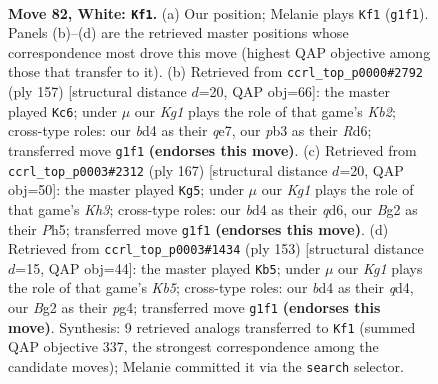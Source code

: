 \documentclass[11pt]{article}
\begin{document}
\clearpage

\begin{figure}[p]\centering
\begin{subfigure}{0.46\textwidth}\centering
\resizebox{\linewidth}{!}{%
\newchessgame
\chessboard[
  setfen={8/8/8/8/3b4/1p5q/3k2B1/6K1 w - - 6 82},
  showmover=false,
  pgfstyle=straightmove, color=movearrow, markmove={g1-f1}
]}
\caption{}
\end{subfigure}\hfill
\begin{subfigure}{0.46\textwidth}\centering
\resizebox{\linewidth}{!}{%
\newchessgame
\chessboard[
  setfen={8/1k2Q3/3r2b1/6P1/5K2/8/8/8 b - - 14 79},
  showmover=false,
  pgfstyle=straightmove, color=movearrow, markmove={b7-c6}
]}
\caption{}
\end{subfigure}
\\[4pt]
\begin{subfigure}{0.46\textwidth}\centering
\resizebox{\linewidth}{!}{%
\newchessgame
\chessboard[
  setfen={q7/8/3Q3k/2P4p/8/2K5/8/8 b - - 4 84},
  showmover=false,
  pgfstyle=straightmove, color=movearrow, markmove={h6-g5}
]}
\caption{}
\end{subfigure}\hfill
\begin{subfigure}{0.46\textwidth}\centering
\resizebox{\linewidth}{!}{%
\newchessgame
\chessboard[
  setfen={2q5/8/6K1/8/1k1Q2P1/8/8/8 b - - 0 77},
  showmover=false,
  pgfstyle=straightmove, color=movearrow, markmove={b4-b5}
]}
\caption{}
\end{subfigure}
\caption{\textbf{Move 82, White: \texttt{Kf1}.} (a) Our position; Melanie plays \texttt{Kf1} (\texttt{g1f1}). Panels (b)--(d) are the retrieved master positions whose correspondence most drove this move (highest QAP objective among those that transfer to it). (b) Retrieved from \texttt{ccrl\_top\_p0000\#2792} (ply 157) [structural distance $d$=20, QAP obj=66]: the master played \texttt{Kc6}; under $\mu$ our \emph{Kg1} plays the role of that game's \emph{Kb2}; cross-type roles: our \emph{b}d4 as their \emph{q}e7, our \emph{p}b3 as their \emph{R}d6; transferred move \texttt{g1f1} \textbf{(endorses this move)}. (c) Retrieved from \texttt{ccrl\_top\_p0003\#2312} (ply 167) [structural distance $d$=20, QAP obj=50]: the master played \texttt{Kg5}; under $\mu$ our \emph{Kg1} plays the role of that game's \emph{Kh3}; cross-type roles: our \emph{b}d4 as their \emph{q}d6, our \emph{B}g2 as their \emph{P}h5; transferred move \texttt{g1f1} \textbf{(endorses this move)}. (d) Retrieved from \texttt{ccrl\_top\_p0003\#1434} (ply 153) [structural distance $d$=15, QAP obj=44]: the master played \texttt{Kb5}; under $\mu$ our \emph{Kg1} plays the role of that game's \emph{Kb5}; cross-type roles: our \emph{b}d4 as their \emph{q}d4, our \emph{B}g2 as their \emph{p}g4; transferred move \texttt{g1f1} \textbf{(endorses this move)}. Synthesis: 9 retrieved analogs transferred to \texttt{Kf1} (summed QAP objective 337, the strongest correspondence among the candidate moves); Melanie committed it via the \texttt{search} selector.}
\label{fig:thought-m162}
\end{figure}
\end{document}
